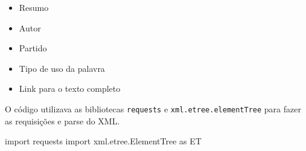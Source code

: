 \documentclass[
]{article}
\newenvironment{Shaded}{\begin{snugshade}}{\end{snugshade}}
\newcommand{\ImportTok}[1]{#1}
\newcommand{\NormalTok}[1]{#1}
\providecommand{\tightlist}{%
  \setlength{\itemsep}{0pt}\setlength{\parskip}{0pt}}
\begin{document}
\begin{itemize}
\tightlist
\item
  Resumo
\item
  Autor
\item
  Partido
\item
  Tipo de uso da palavra
\item
  Link para o texto completo
\end{itemize}

O código utilizava as bibliotecas \texttt{requests} e
\texttt{xml.etree.elementTree} para fazer as requisições e parse do XML.

\begin{Shaded}
\begin{Highlighting}[]
\ImportTok{import}\NormalTok{ requests}
\ImportTok{import}\NormalTok{ xml.etree.ElementTree }\ImportTok{as}\NormalTok{ ET}


\end{Highlighting}
\end{Shaded}
\end{document}

